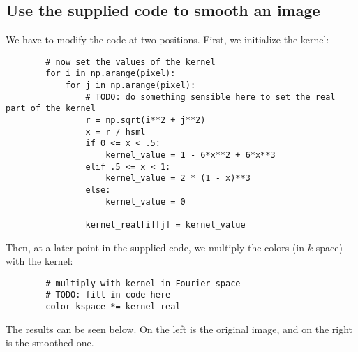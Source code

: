 \subsection{Use the supplied code to smooth an image}
    We have to modify the code at two positions.
    First, we initialize the kernel:
    \begin{lstlisting}
        # now set the values of the kernel
        for i in np.arange(pixel):
            for j in np.arange(pixel):
                # TODO: do something sensible here to set the real part of the kernel
                r = np.sqrt(i**2 + j**2)
                x = r / hsml
                if 0 <= x < .5:
                    kernel_value = 1 - 6*x**2 + 6*x**3
                elif .5 <= x < 1:
                    kernel_value = 2 * (1 - x)**3
                else:
                    kernel_value = 0
        
                kernel_real[i][j] = kernel_value\end{lstlisting}
    \newpage \noindent
    Then, at a later point in the supplied code, 
    we multiply the colors (in $k$-space) with the kernel:
    \begin{lstlisting}
        # multiply with kernel in Fourier space
        # TODO: fill in code here
        color_kspace *= kernel_real\end{lstlisting}
    The results can be seen below. On the left is the original image, 
    and on the right is the smoothed one.
    \begin{figure}[h!]
        \centering
        \begin{minipage}{.5\linewidth}
          \centering
        \end{minipage}%
        \begin{minipage}{.5\linewidth}
          \centering
        \end{minipage}
    \end{figure} \ \\

